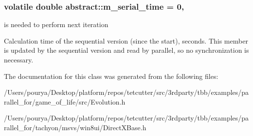 \subsubsection[{m\+\_\+serial\+\_\+time}]{\setlength{\rightskip}{0pt plus 5cm}volatile double abstract\+::m\+\_\+serial\+\_\+time = 0\hspace{0.3cm}{\ttfamily [static]}, {\ttfamily [protected]}}\label{classabstract_a695c458d4949105d155a6839b1570b0d}


is needed to perform next iteration 

Calculation time of the sequential version (since the start), seconds. This member is updated by the sequential version and read by parallel, so no synchronization is necessary. 

The documentation for this class was generated from the following files\+:\begin{DoxyCompactItemize}
\item 
/\+Users/pourya/\+Desktop/platform/repos/tetcutter/src/3rdparty/tbb/examples/parallel\+\_\+for/game\+\_\+of\+\_\+life/src/Evolution.\+h\item 
/\+Users/pourya/\+Desktop/platform/repos/tetcutter/src/3rdparty/tbb/examples/parallel\+\_\+for/tachyon/msvs/win8ui/Direct\+X\+Base.\+h\end{DoxyCompactItemize}
